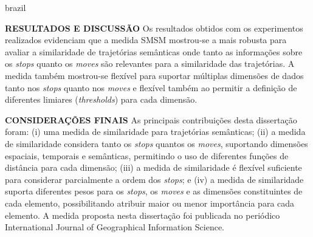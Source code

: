 {\begin{otherlanguage*}{brazil}
\begin{resumo}
        \textbf{RESULTADOS E DISCUSSÃO}
        \newline
        \newline
        Os resultados obtidos com os experimentos realizados evidenciam que a medida SMSM mostrou-se a mais robusta para avaliar a similaridade de trajetórias semânticas onde tanto as informações sobre os \emph{stops} quanto os \emph{moves} são relevantes para a similaridade das trajetórias. A medida também mostrou-se flexível para suportar múltiplas dimensões de dados tanto nos \emph{stops} quanto nos \emph{moves} e flexível também ao permitir a definição de diferentes limiares (\emph{thresholds}) para cada dimensão.
        
        \newline
        \newline
        \textbf{CONSIDERAÇÕES FINAIS}
        \newline
        \newline
        As principais contribuições desta dissertação foram: (i) uma medida de similaridade para trajetórias semânticas; (ii) a medida de similaridade considera tanto os \emph{stops} quantos os \emph{moves}, suportando dimensões espaciais, temporais e semânticas, permitindo o uso de diferentes funções de distância para cada dimensão; (iii) a medida de similaridade é flexível suficiente para considerar parcialmente a ordem dos \emph{stops}; e (iv) a medida de similaridade suporta diferentes pesos para os \emph{stops}, os \emph{moves} e as dimensões constituintes de cada elemento, possibilitando atribuir maior ou menor importância para cada elemento. A medida proposta nesta dissertação foi publicada no periódico International Journal of Geographical Information Science.

    \end{resumo}
    \end{otherlanguage*}
}
